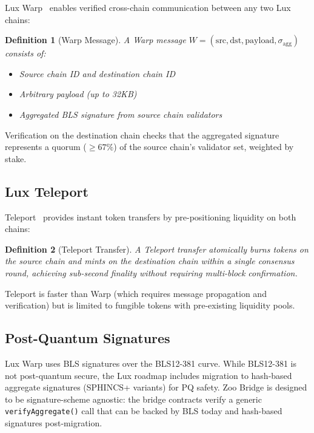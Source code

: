 \documentclass[11pt,letterpaper]{article}
\newtheorem{definition}{Definition}[section]
\begin{document}
Lux Warp~\cite{lux-warp-messaging} enables verified cross-chain communication between any two Lux chains:

\begin{definition}[Warp Message]
A Warp message $W = (\text{src}, \text{dst}, \text{payload}, \sigma_{\text{agg}})$ consists of:
\begin{itemize}
    \item Source chain ID and destination chain ID
    \item Arbitrary payload (up to 32KB)
    \item Aggregated BLS signature from source chain validators
\end{itemize}
\end{definition}

Verification on the destination chain checks that the aggregated signature represents a quorum ($\geq 67\%$) of the source chain's validator set, weighted by stake.

\subsection{Lux Teleport}

Teleport~\cite{lux-teleport-protocol} provides instant token transfers by pre-positioning liquidity on both chains:

\begin{definition}[Teleport Transfer]
A Teleport transfer atomically burns tokens on the source chain and mints on the destination chain within a single consensus round, achieving sub-second finality without requiring multi-block confirmation.
\end{definition}

Teleport is faster than Warp (which requires message propagation and verification) but is limited to fungible tokens with pre-existing liquidity pools.

\subsection{Post-Quantum Signatures}

Lux Warp uses BLS signatures over the BLS12-381 curve. While BLS12-381 is not post-quantum secure, the Lux roadmap includes migration to hash-based aggregate signatures (SPHINCS+ variants) for PQ safety. Zoo Bridge is designed to be signature-scheme agnostic: the bridge contracts verify a generic \texttt{verifyAggregate()} call that can be backed by BLS today and hash-based signatures post-migration.
\end{document}
